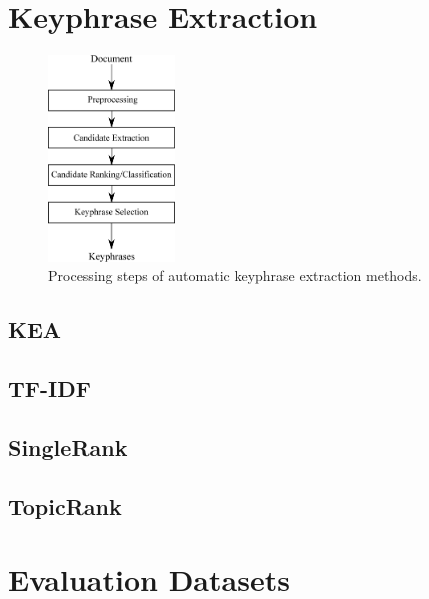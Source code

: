 \section{Keyphrase Extraction}
\label{sec:keyphrase_extraction}
  \begin{figure}
    \centering
    \includegraphics[width=0.3\textwidth]{include/processing_steps.eps}
    \caption{Processing steps of automatic keyphrase extraction methods.
             \label{fig:processing_steps}}
  \end{figure}

  \subsection{KEA}
  \label{subsec:kea}
  \subsection{TF-IDF}
  \label{subsec:tfidf}
  \subsection{SingleRank}
  \label{subsec:singlerank}
  \subsection{TopicRank}
  \label{subsec:topicrank}

\section{Evaluation Datasets}
\label{sec:evaluation_datasets}

